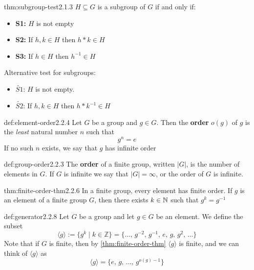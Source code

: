 \documentclass[landscape, 8pt]{extarticle}
\begin{document}
\begin{multicols}{3}
\begin{thm}{thm:subgroup-test}{2.1.3}
    $H\subseteq G$ is a subgroup of $G$ if and only if:
    \renewcommand\labelitemi{\tiny$\bullet$}
    \begin{itemize}
        \setlength\itemsep{0em}
        \item \textbf{S1:} $H$ is not empty
        \item \textbf{S2:} If $h,k\in H$ then $h\ast k\in H$
        \item \textbf{S3:} If $h\in H$ then $h^{-1}\in H$
    \end{itemize}
    Alternative test for subgroups:
    \renewcommand\labelitemi{\tiny$\bullet$}
    \begin{itemize}
        \setlength\itemsep{0em}
        \item $\widetilde{S1}$: $H$ is not empty.
        \item $\widetilde{S2}$: If $h,k\in H$ then $h*k^{-1}\in H$
    \end{itemize}
\end{thm}
\vspace{-5pt}

\begin{dfn}{def:element-order}{2.2.4}
    Let $G$ be a group and $g\in G$. Then the \textbf{order} $o(g)$ of $g$ is the \textit{least} natural number $n$ such that
    $$g^n = e$$
    If no such $n$ exists, we say that $g$ has infinite order
\end{dfn}
\vspace{-5pt}

\begin{dfn}{def:group-order}{2.2.3}
    The \textbf{order} of a finite group, written $\lvert G \rvert$, is the number of elements in $G$.
    If $G$ is infinite we say that $\lvert G \rvert = \infty$, or the order of $G$ is infinite.
\end{dfn}
\vspace{-5pt}

\begin{thm}{thm:finite-order-thm}{2.2.6}
    In a finite group, every element has finite order.\newline
    If $g$ is an element of a finite group $G$, then there exists $k\in \mathbb{N}$ such that $g^{k} = g^{-1}$
\end{thm}
\vspace{-5pt}

\begin{dfn}{def:generator}{2.2.8}
    Let $G$ be a group and let $g\in G$ be an element. We define the subset
    $$\langle g \rangle := \{g^k \mid k\in\mathbb{Z}\} = \{\dots,\,g^{-2},\,g^{-1},\,e,\,g,\,g^{2},\,\dots \}$$
    Note that if $G$ is finite, then by \ref{thm:finite-order-thm} $\langle g \rangle$ is finite, and we can think of $\langle g \rangle$ as
    $$\langle g \rangle = \{e,\,g,\,\dots,\,g^{o(g)-1}\}$$
\end{dfn}
\vspace{-5pt}


\end{multicols}
\end{document}
